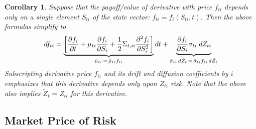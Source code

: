 \documentclass[12pt]{article}
\theoremstyle{plain}
\newtheorem{cor}[thm]{Corollary}
\theoremstyle{definition}
\theoremstyle{remark}
\begin{document}
\begin{cor}
Suppose that the payoff/value of derivative with price $f_{ti}$ depends
only on a single element $S_{ti}$ of the state vector:
$f_{ti}=f_i(S_{ti},t)$. Then the above formulas simplify to
\begin{align}
  df_{ti}
  =
  \underbrace{%
    \left[
      \frac{\partial f_i}{\partial t}
      +
      \mu_{ti}
      \frac{\partial f_i}{\partial S_i}
      +
      \frac{1}{2}
      \Sigma_{t,ii}
      \frac{\partial^2 f_i}{\partial S_i^2}
    \right]
  }_{\tilde{\mu}_{ti}\,=\,\hat{\mu}_{ti}f_{ti}}
  dt
  +
  \underbrace{%
    \frac{\partial f_i}{\partial S_i}
    \sigma_{ti}
    \;dZ_{ti}
  }_{\tilde{\sigma}_{ti}\,d\tilde{Z}_t\,=\,\hat{\sigma}_{ti}f_{ti}\,d\tilde{Z}_t}
\end{align}
Subscripting derivative price $f_{ti}$ and its drift and diffusion
coefficients by $i$ emphasizes that this derivative depends only upon
$Z_{ti}$ risk.  Note that the above also implies $\tilde{Z}_t=Z_{ti}$
for this derivative.
\end{cor}

\clearpage
\subsection{Market Price of Risk}

\end{document}
